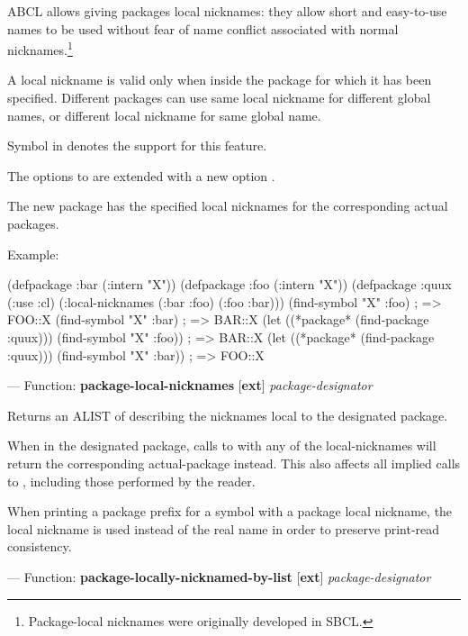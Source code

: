 \documentclass[10pt]{book}
\begin{document}
ABCL allows giving packages local nicknames: they allow short and
easy-to-use names to be used without fear of name conflict associated
with normal nicknames.\footnote{Package-local nicknames were originally
developed in SBCL.}

A local nickname is valid only when inside the package for which it
has been specified. Different packages can use same local nickname for
different global names, or different local nickname for same global
name.

Symbol  in  denotes the
support for this feature.

The options to  are extended with a new option
.

The new package has the specified local nicknames for the corresponding
actual packages.

Example:
\begin{listing-lisp}
(defpackage :bar (:intern "X"))
(defpackage :foo (:intern "X"))
(defpackage :quux (:use :cl)
  (:local-nicknames (:bar :foo) (:foo :bar)))
(find-symbol "X" :foo) ; => FOO::X
(find-symbol "X" :bar) ; => BAR::X
(let ((*package* (find-package :quux)))
  (find-symbol "X" :foo))               ; => BAR::X
(let ((*package* (find-package :quux)))
  (find-symbol "X" :bar))               ; => FOO::X
\end{listing-lisp}

--- Function: \textbf{package-local-nicknames} [\textbf{ext}] \textit{package-designator}

\begin{adjustwidth}{5em}{5em}
  Returns an ALIST of 
  describing the nicknames local to the designated package.

  When in the designated package, calls to  with any
  of the local-nicknames will return the corresponding actual-package
  instead. This also affects all implied calls to ,
  including those performed by the reader.

  When printing a package prefix for a symbol with a package local
  nickname, the local nickname is used instead of the real name in order
  to preserve print-read consistency.
\end{adjustwidth}

--- Function: \textbf{package-locally-nicknamed-by-list} [\textbf{ext}] \textit{package-designator}
\end{document}
